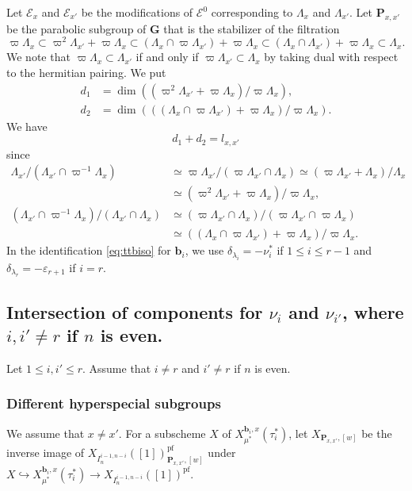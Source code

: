 \documentclass[12pt,a4paper]{article}
\newcommand{\bfG}{\mathbf{G}}
\newcommand{\bfP}{\mathbf{P}}
\newcommand{\bfb}{\mathbf{b}}
\newcommand{\cE}{\mathcal{E}}
\newcommand{\pf}{\mathrm{pf}}
\begin{document}
Let $\cE_x$ and $\cE_{x'}$ be the modifications of 
$\cE^0$ corresponding to $\Lambda_x$ and $\Lambda_{x'}$. 
Let $\bfP_{x,x'}$ be the parabolic subgroup of $\bfG$ that is the stabilizer of the filtration 
\[
 \varpi \Lambda_x \subset 
 \varpi^2 \Lambda_{x'} + \varpi \Lambda_x 
 \subset 
 (\Lambda_x \cap \varpi \Lambda_{x'}) +\varpi \Lambda_x \subset 
 (\Lambda_x \cap \Lambda_{x'}) +\varpi \Lambda_x \subset \Lambda_x. 
\]
We note that 
$\varpi \Lambda_x \subset \Lambda_{x'}$ if and only if 
$\varpi \Lambda_{x'} \subset \Lambda_x$ 
by taking dual with respect to the hermitian pairing. 
We put 
\begin{align*}
 d_1 &=\dim ((\varpi^2 \Lambda_{x'} + \varpi \Lambda_x)/\varpi \Lambda_x), \\
 d_2 &=\dim (((\Lambda_x \cap \varpi \Lambda_{x'}) +\varpi \Lambda_x)/\varpi \Lambda_x). 
\end{align*}
We have 
\begin{equation}\label{eq:d12l}
 d_1 +d_2 =l_{x,x'} 
\end{equation} 
since 
\begin{align*}
  \Lambda_{x'}/( \Lambda_{x'} \cap \varpi^{-1} \Lambda_x) &\simeq \varpi \Lambda_{x'}/(\varpi \Lambda_{x'} \cap \Lambda_x) \simeq (\varpi \Lambda_{x'} + \Lambda_x)/ \Lambda_x \\ 
  &\simeq (\varpi^2 \Lambda_{x'} + \varpi \Lambda_x)/ \varpi\Lambda_x ,\\ 
  ( \Lambda_{x'} \cap \varpi^{-1} \Lambda_x)/( \Lambda_{x'} \cap \Lambda_x) &\simeq 
  ( \varpi \Lambda_{x'} \cap  \Lambda_x)/( \varpi \Lambda_{x'} \cap \varpi \Lambda_x) \\ &\simeq ((\Lambda_x \cap \varpi \Lambda_{x'}) +\varpi \Lambda_x)/\varpi \Lambda_x. 
\end{align*}
In the identification \eqref{eq:ttbiso} for $\bfb_i$, we use $\delta_{\lambda_i}=-\nu_i^*$ if $1 \leq i \leq r-1$ and 
$\delta_{\lambda_r}=-\varepsilon_{r+1}$ if $i=r$. 

\subsection{Intersection of components for $\nu_i$ and $\nu_{i'}$, where $i,i' \neq r$ if $n$ is even.}

Let $1 \leq i, i' \leq r$. Assume that $i\neq r$ and $i' \neq r$ if $n$ is even. 

\subsubsection{Different hyperspecial subgroups}
We assume that $x \neq x'$. 
For a subscheme $X$ of $X_{\mu^*}^{\bfb_i,x}(\tau_i^*)$, 
let 
$X_{\bfP_{x,x'},[w]}$ be the inverse image of 
$X_{I_{n}^{i-1,n-i}}([1])_{\bfP_{x,x'},[w]}^{\pf}$ 
under 
$X \hookrightarrow X_{\mu^*}^{\bfb_i,x}(\tau_i^*) \to X_{I_{n}^{i-1,n-i}}([1])^{\pf}$. 
\end{document}
